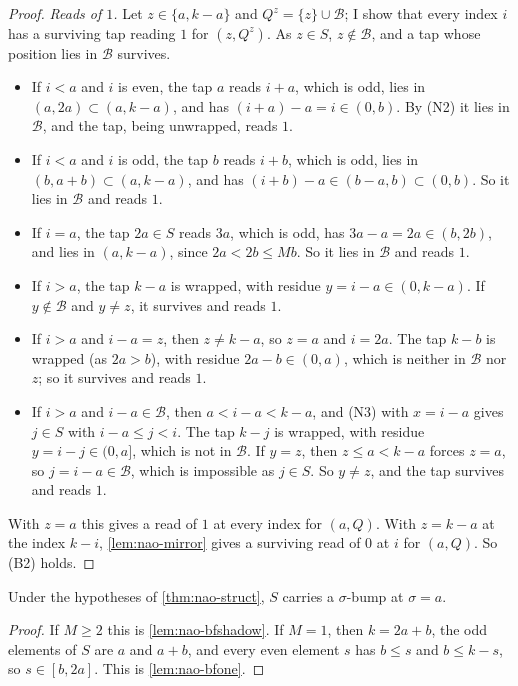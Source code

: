 \begin{proof}
\emph{Reads of $1$.} Let $z\in\{a,k-a\}$ and $Q^z=\{z\}\cup \mathcal B$; I show that
every index $i$ has a surviving tap reading $1$ for $(z,Q^z)$. As
$z\in S$, $z\notin \mathcal B$, and a tap whose position lies in $\mathcal B$ survives.
\begin{itemize}
\item If $i<a$ and $i$ is even, the tap $a$ reads $i+a$, which is odd, lies in
$(a,2a)\subset(a,k-a)$, and has $(i+a)-a=i\in(0,b)$. By (N2) it lies in
$\mathcal B$, and the tap, being unwrapped, reads $1$.
\item If $i<a$ and $i$ is odd, the tap $b$ reads $i+b$, which is odd, lies
in $(b,a+b)\subset(a,k-a)$, and has $(i+b)-a\in(b-a,b)\subset(0,b)$.
So it lies in $\mathcal B$ and reads $1$.
\item If $i=a$, the tap $2a\in S$ reads $3a$, which is odd, has
$3a-a=2a\in(b,2b)$, and lies in $(a,k-a)$, since $2a<2b\le Mb$. So it
lies in $\mathcal B$ and reads $1$.
\item If $i>a$, the tap $k-a$ is wrapped, with residue $y=i-a\in(0,k-a)$. If
$y\notin \mathcal B$ and $y\ne z$, it survives and reads $1$.
\item If $i>a$ and $i-a=z$, then $z\ne k-a$, so $z=a$ and $i=2a$. The tap $k-b$ is
wrapped (as $2a>b$), with residue $2a-b\in(0,a)$, which is neither in $\mathcal B$
nor $z$; so it survives and reads $1$.
\item If $i>a$ and $i-a\in \mathcal B$, then $a<i-a<k-a$, and (N3) with $x=i-a$ gives $j\in S$
with $i-a\le j<i$. The tap $k-j$ is wrapped, with residue $y=i-j\in(0,a]$,
which is not in $\mathcal B$. If $y=z$, then $z\le a<k-a$ forces $z=a$, so
$j=i-a\in \mathcal B$, which is impossible as $j\in S$. So $y\ne z$, and the tap
survives and reads $1$.
\end{itemize}
With $z=a$ this gives a read of $1$ at every index for $(a,Q)$. With $z=k-a$
at the index $k-i$, \autoref{lem:nao-mirror} gives a surviving read of $0$
at $i$ for $(a,Q)$. So (B2) holds.
\end{proof}

\begin{corollary}
\label{cor:nao-bothfailing}
Under the hypotheses of \autoref{thm:nao-struct}, $S$ carries a $\sigma$-bump
at $\sigma=a$.
\end{corollary}

\begin{proof}
If $M\ge2$ this is \autoref{lem:nao-bfshadow}. If $M=1$, then $k=2a+b$, the
odd elements of $S$ are $a$ and $a+b$, and every even element $s$ has
$b\le s$ and $b\le k-s$, so $s\in[b,2a]$. This is
\autoref{lem:nao-bfone}.
\end{proof}

